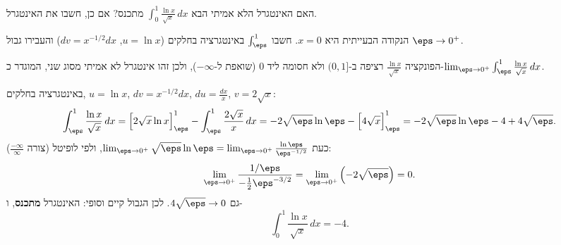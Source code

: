
\begin{question}
האם האינטגרל הלא אמיתי הבא $\displaystyle\int_0^1\frac{\ln x}{\sqrt x}\,dx$ מתכנס? אם כן, חשבו את האינטגרל.
\end{question}

\begin{hint}
הנקודה הבעייתית היא $x=0$. חשבו $\int_\eps^1$ באינטגרציה בחלקים ($u=\ln x$, $dv=x^{-1/2}dx$) והעבירו גבול $\eps\to0^+$.
\end{hint}

\begin{solution}
הפונקציה $\frac{\ln x}{\sqrt x}$ רציפה ב-$(0,1]$ ולא חסומה ליד $0$ (שואפת ל-$-\infty$), ולכן זהו אינטגרל לא אמיתי מסוג שני, המוגדר כ-$\lim_{\eps\to0^+}\int_\eps^1\frac{\ln x}{\sqrt x}\,dx$.

באינטגרציה בחלקים, $u=\ln x$, $dv=x^{-1/2}dx$, $du=\frac{dx}x$, $v=2\sqrt x$:
\[ \int_\eps^1\frac{\ln x}{\sqrt x}\,dx=\Big[2\sqrt x\ln x\Big]_\eps^1-\int_\eps^1\frac{2\sqrt x}{x}\,dx=-2\sqrt\eps\ln\eps-\Big[4\sqrt x\Big]_\eps^1=-2\sqrt\eps\ln\eps-4+4\sqrt\eps. \]
כעת $\lim_{\eps\to0^+}\sqrt\eps\ln\eps=\lim_{\eps\to0^+}\frac{\ln\eps}{\eps^{-1/2}}$, ולפי לופיטל (צורה $\frac{-\infty}{\infty}$):
\[ \lim_{\eps\to0^+}\frac{1/\eps}{-\frac12\eps^{-3/2}}=\lim_{\eps\to0^+}\left(-2\sqrt\eps\right)=0. \]
גם $4\sqrt\eps\to0$. לכן הגבול קיים וסופי: האינטגרל \textbf{מתכנס}, ו-
\[ \int_0^1\frac{\ln x}{\sqrt x}\,dx=-4. \]
\end{solution}
